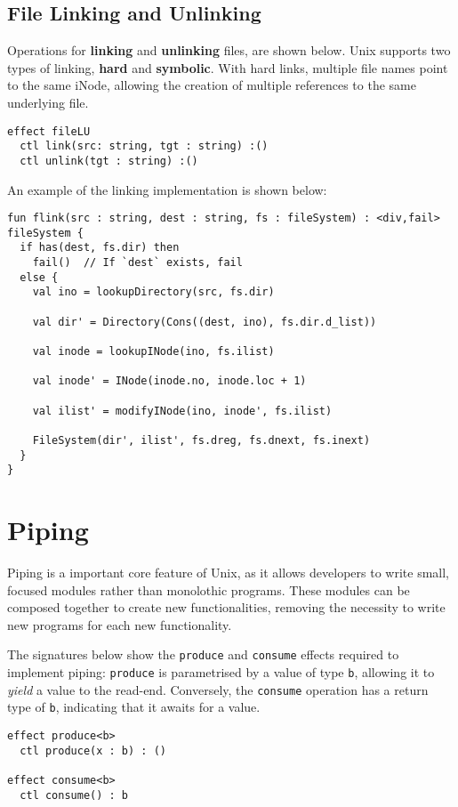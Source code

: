 \documentclass[logo,bsc,singlespacing,parskip]{infthesis}
\begin{document}
\subsection{File Linking and Unlinking}
Operations for \textbf{linking} and \textbf{unlinking} files, are shown below. Unix supports two types of linking, \textbf{hard} and \textbf{symbolic}. With hard links, multiple file names point to the same iNode, allowing the creation of multiple references to the same underlying file.

\begin{lstlisting}
effect fileLU
  ctl link(src: string, tgt : string) :()
  ctl unlink(tgt : string) :()
\end{lstlisting}

An example of the linking implementation is shown below:
\begin{lstlisting}
fun flink(src : string, dest : string, fs : fileSystem) : <div,fail> fileSystem {
  if has(dest, fs.dir) then
    fail()  // If `dest` exists, fail
  else {
    val ino = lookupDirectory(src, fs.dir)

    val dir' = Directory(Cons((dest, ino), fs.dir.d_list))

    val inode = lookupINode(ino, fs.ilist)

    val inode' = INode(inode.no, inode.loc + 1)

    val ilist' = modifyINode(ino, inode', fs.ilist)

    FileSystem(dir', ilist', fs.dreg, fs.dnext, fs.inext)
  }
}
\end{lstlisting}


\section{Piping}
Piping is a important core feature of Unix,  as it allows developers to write  small, focused modules rather than monolothic programs. These modules can be composed together to create new functionalities, removing the necessity to write new programs for each new functionality.

The signatures below show the \lstinline{produce} and \lstinline{consume} effects required to implement piping: \lstinline{produce} is parametrised by a value of type \lstinline{b}, allowing it to \textit{yield} a value to the read-end. Conversely, the \lstinline{consume} operation has a return type of \lstinline{b}, indicating that it awaits for a value.
\begin{lstlisting}
effect produce<b>
  ctl produce(x : b) : ()   

effect consume<b>
  ctl consume() : b         

\end{lstlisting}
\end{document}
